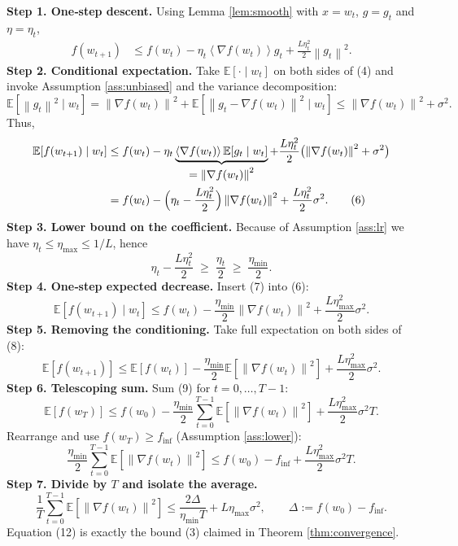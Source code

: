 \documentclass{article}
\newcommand{\EE}{\mathbb{E}}
\newcommand{\norm}[1]{\left\lVert #1\right\rVert}
\newcommand{\inner}[1]{\left\langle #1\right\rangle}
\begin{document}
\noindent\textbf{Step 1. One‑step descent.}  
Using Lemma \ref{lem:smooth} with $x=w_t$, $g=g_t$ and $\eta=\eta_t$,
\begin{align}
f(w_{t+1})
&\le f(w_t)-\eta_t\inner{\nabla f(w_t)}{g_t}
      +\frac{L\eta_t^{2}}{2}\norm{g_t}^{2}. \tag{4}
\end{align}
\noindent\textbf{Step 2. Conditional expectation.}  
Take $\EE[\cdot\mid w_t]$ on both sides of (4) and invoke Assumption \ref{ass:unbiased} and the variance decomposition:
\[
\EE\!\left[\norm{g_t}^{2}\mid w_t\right]
 =\norm{\nabla f(w_t)}^{2}
   +\EE\!\left[\norm{g_t-\nabla f(w_t)}^{2}\mid w_t\right]
 \le \norm{\nabla f(w_t)}^{2}+\sigma^{2}.
\tag{5}
\]
Thus,
\begin{align}
\EE\!\left[f(w_{t+1})\mid w_t\right]
&\le f(w_t)-\eta_t\underbrace{\inner{\nabla f(w_t)}{\EE[g_t\mid w_t]}}_{\displaystyle =\norm{\nabla f(w_t)}^{2}}
   +\frac{L\eta_t^{2}}{2}\bigl(\norm{\nabla f(w_t)}^{2}+\sigma^{2}\bigr) \nonumber\\
&= f(w_t)-\Bigl(\eta_t-\frac{L\eta_t^{2}}{2}\Bigr)\norm{\nabla f(w_t)}^{2}
   +\frac{L\eta_t^{2}}{2}\sigma^{2}. \tag{6}
\end{align}
\noindent\textbf{Step 3. Lower bound on the coefficient.}  
Because of Assumption \ref{ass:lr} we have $\eta_t\le \eta_{\max}\le 1/L$, hence
\[
\eta_t-\frac{L\eta_t^{2}}{2}
   \;\ge\; \frac{\eta_t}{2}
   \;\ge\; \frac{\eta_{\min}}{2}. \tag{7}
\]
\noindent\textbf{Step 4. One‑step expected decrease.}  
Insert (7) into (6):
\[
\EE\!\left[f(w_{t+1})\mid w_t\right]
\le f(w_t)-\frac{\eta_{\min}}{2}\norm{\nabla f(w_t)}^{2}
     +\frac{L\eta_{\max}^{2}}{2}\sigma^{2}. \tag{8}
\]
\noindent\textbf{Step 5. Removing the conditioning.}  
Take full expectation on both sides of (8):
\[
\EE\!\left[f(w_{t+1})\right]
\le \EE\!\left[f(w_t)\right]
    -\frac{\eta_{\min}}{2}\EE\!\left[\norm{\nabla f(w_t)}^{2}\right]
    +\frac{L\eta_{\max}^{2}}{2}\sigma^{2}. \tag{9}
\]
\noindent\textbf{Step 6. Telescoping sum.}  
Sum (9) for $t=0,\dots,T-1$:
\[
\EE\!\left[f(w_T)\right]
\le f(w_0)
    -\frac{\eta_{\min}}{2}\sum_{t=0}^{T-1}\EE\!\left[\norm{\nabla f(w_t)}^{2}\right]
    +\frac{L\eta_{\max}^{2}}{2}\sigma^{2}T . \tag{10}
\]
Rearrange and use $f(w_T)\ge f_{\inf}$ (Assumption \ref{ass:lower}):
\[
\frac{\eta_{\min}}{2}\sum_{t=0}^{T-1}\EE\!\left[\norm{\nabla f(w_t)}^{2}\right]
\le f(w_0)-f_{\inf}
   +\frac{L\eta_{\max}^{2}}{2}\sigma^{2}T .
\tag{11}
\]
\noindent\textbf{Step 7. Divide by $T$ and isolate the average.}
\[
\frac{1}{T}\sum_{t=0}^{T-1}\EE\!\left[\norm{\nabla f(w_t)}^{2}\right]
\le \frac{2\Delta}{\eta_{\min}T}
   + L\eta_{\max}\sigma^{2}, \qquad
\Delta:=f(w_0)-f_{\inf}. \tag{12}
\]
Equation (12) is exactly the bound (3) claimed in Theorem \ref{thm:convergence}. \qedhere
\end{document}
